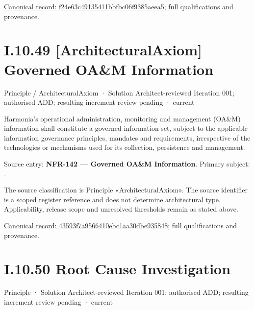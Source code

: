 {\footnotesize \href{../../../../continuum/motivation/principle/architectural-axiom/f24e63c49135411bbfbc06f9385aeea5.md}{Canonical record: f24e63c49135411bbfbc06f9385aeea5}; full qualifications and provenance.}\par
\section*{I.10.49 [ArchitecturalAxiom] Governed OA\&M Information}
\label{navigation:I.10.49}

\label{element:43593f7a9566410ebc1aa30dbe935848}
{\small Principle / ArchitecturalAxiom · Solution Architect-reviewed Iteration 001; authorised ADD; resulting increment review pending · current}\par

Harmonia's operational administration, monitoring and management (OA\&M) information shall constitute a governed information set, subject to the applicable information governance principles, mandates and requirements, irrespective of the technologies or mechanisms used for its collection, persistence and management.



Source entry: \textbf{NFR-142 — Governed OA\&M Information}. Primary subject: \texttt{}.



The source classification is Principle «ArchitecturalAxiom». The source identifier is a scoped register reference and does not determine architectural type. Applicability, release scope and unresolved thresholds remain as stated above.


{\footnotesize \href{../../../../continuum/motivation/principle/architectural-axiom/43593f7a9566410ebc1aa30dbe935848.md}{Canonical record: 43593f7a9566410ebc1aa30dbe935848}; full qualifications and provenance.}\par
\section*{I.10.50 Root Cause Investigation}
\label{navigation:I.10.50}

\label{element:9cdbf642158c4c37a6f3f10a6dd9ebfe}
{\small Principle · Solution Architect-reviewed Iteration 001; authorised ADD; resulting increment review pending · current}\par

